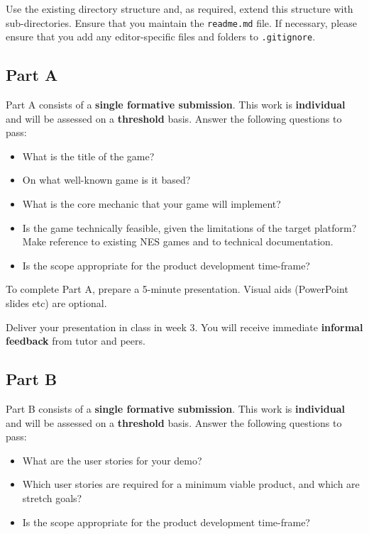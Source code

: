 \documentclass{../../fal_assignment}
\begin{document}
Use the existing directory structure and, as required, extend this structure with sub-directories.
Ensure that you maintain the \texttt{readme.md} file.
If necessary, please ensure that you add any editor-specific files and folders to \texttt{.gitignore}. 

\subsection*{Part A}

Part A consists of a \textbf{single formative submission}. This work is \textbf{individual} and will be assessed on a \textbf{threshold} basis. Answer the following questions to pass:

\begin{itemize}
	\item What is the title of the game?
	\item On what well-known game is it based?
	\item What is the core mechanic that your game will implement?
	\item Is the game technically feasible, given the limitations of the target platform?
		Make reference to existing NES games and to technical documentation.
	\item Is the scope appropriate for the product development time-frame?
\end{itemize}

To complete Part A, prepare a 5-minute presentation.
Visual aids (PowerPoint slides etc) are optional.

Deliver your presentation in class in week 3. You will receive immediate \textbf{informal feedback}
from tutor and peers.

\subsection*{Part B}

Part B consists of a \textbf{single formative submission}. This work is \textbf{individual} and will be assessed on a \textbf{threshold} basis. Answer the following questions to pass:

\begin{itemize}
	\item What are the user stories for your demo?
	\item Which user stories are required for a minimum viable product, and which are stretch goals?
	\item Is the scope appropriate for the product development time-frame?
\end{itemize}
\end{document}
